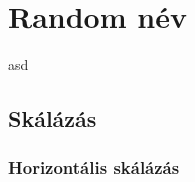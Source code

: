 \chapter{Random név}
\label{sec:lorem}

asd

\section{Skálázás}


\subsection{Horizontális skálázás}
